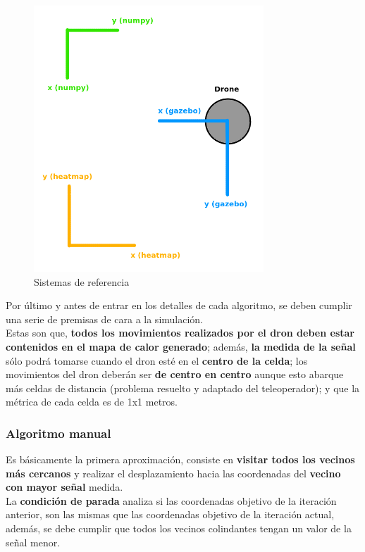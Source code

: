 \begin{figure} [H]
    \begin{center}
    \includegraphics[height=10cm]{imagenes/cap4/8_reference_system.png}
    \end{center}
    \caption[Sistemas de referencia]{Sistemas de referencia}
    \label{fig:reference_sys}
\end{figure}

Por último y antes de entrar en los detalles de cada algoritmo, se deben cumplir una serie de premisas de cara a la simulación.\\ 

Estas son que, \textbf{todos los movimientos realizados por el dron deben estar contenidos en el mapa de calor generado}; además, \textbf{la medida de la señal} sólo podrá tomarse cuando el dron esté en el \textbf{centro de la celda}; los movimientos del dron deberán ser \textbf{de centro en centro} aunque esto abarque más celdas de distancia (problema resuelto y adaptado del teleoperador); y que la métrica de cada celda es de 1x1 metros.

\subsubsection{Algoritmo manual}
\label{subsec:alg-manual}

Es básicamente la primera aproximación, consiste en \textbf{visitar todos los vecinos más cercanos} y realizar el desplazamiento hacia las coordenadas del \textbf{vecino con mayor señal} medida.\\

La \textbf{condición de parada} analiza si las coordenadas objetivo de la iteración anterior, son las mismas que las coordenadas objetivo de la iteración actual, además, se debe cumplir que todos los vecinos colindantes tengan un valor de la señal menor.\\

